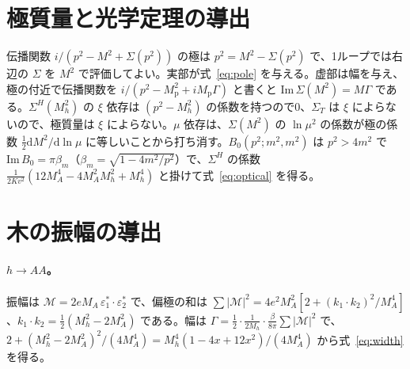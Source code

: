 \documentclass[a4paper,10pt]{ltjsarticle}
\newcommand{\dd}{\mathrm{d}}
\newcommand{\im}{\mathrm{Im}\,}
\begin{document}
\section{極質量と光学定理の導出}\label{app:pole}

伝播関数 $i/(p^2-M^2+\Sigma(p^2))$ の極は $p^2=M^2-\Sigma(p^2)$ で、1ループでは右辺の $\Sigma$ を $M^2$ で評価してよい。実部が式~\eqref{eq:pole} を与える。虚部は幅を与え、極の付近で伝播関数を $i/(p^2-M_{\mathrm p}^2+iM_{\mathrm p}\Gamma)$ と書くと $\im\Sigma(M^2)=M\Gamma$ である。$\Sigma^H(M_h^2)$ の $\xi$ 依存は $(p^2-M_h^2)$ の係数を持つので0、$\Sigma_T$ は $\xi$ によらないので、極質量は $\xi$ によらない。$\mu$ 依存は、$\Sigma(M^2)$ の $\ln\mu^2$ の係数が極の係数 $\frac12\dd M^2/\dd\ln\mu$ に等しいことから打ち消す。$B_0(p^2;m^2,m^2)$ は $p^2>4m^2$ で $\im B_0=\pi\beta_m$（$\beta_m=\sqrt{1-4m^2/p^2}$）で、$\Sigma^H$ の係数 $\frac{1}{2Kv^2}(12M_A^4-4M_A^2M_h^2+M_h^4)$ と掛けて式~\eqref{eq:optical} を得る。

\section{木の振幅の導出}\label{app:tree}

\paragraph{$h\to AA$。}振幅は $\mathcal M=2eM_A\,\varepsilon_1^*\cdot\varepsilon_2^*$ で、偏極の和は $\sum|\mathcal M|^2=4e^2M_A^2[2+(k_1\cdot k_2)^2/M_A^4]$、$k_1\cdot k_2=\frac12(M_h^2-2M_A^2)$ である。幅は $\Gamma=\frac12\cdot\frac1{2M_h}\cdot\frac{\beta}{8\pi}\sum|\mathcal M|^2$ で、$2+(M_h^2-2M_A^2)^2/(4M_A^4)=M_h^4(1-4x+12x^2)/(4M_A^4)$ から式~\eqref{eq:width} を得る。
\end{document}
